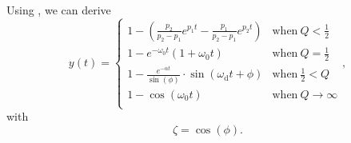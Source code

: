 \documentclass{article}[11pt]
\begin{document}
Using \cite{golnaraghi-acs-10}, we can derive 
\begin{equation}
y(t)=
\begin{cases}
1-\left(\frac{p_2}{p_2-p_1} e^{p_1 t}-\frac{p_1}{p_2-p_1} e^{p_2 t}\right)             & \mathrm{when} \ Q <\frac{1}{2} \\
1 - e^{-\omega_0 t} (1+\omega_0 t)                                                     & \mathrm{when} \ Q = \frac{1}{2} \\
1-\frac{e^{-\alpha t}}{\sin(\phi)} \cdot \sin\left(\omega_{\mathrm{d}} t + \phi\right) & \mathrm{when} \ \frac{1}{2} < Q  \\
1 - \cos(\omega_0 t)                                                                   & \mathrm{when} \ Q \rightarrow \infty \\
\end{cases}, 
\end{equation}
with
\begin{equation}
\zeta = \cos(\phi).
\end{equation}
\end{document}
